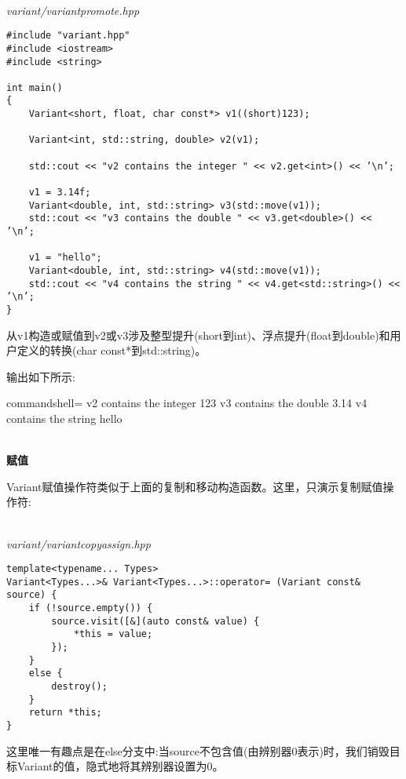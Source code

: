 \hspace*{\fill} \\ %
\noindent
\textit{variant/variantpromote.hpp}
\begin{lstlisting}[style=styleCXX]
#include "variant.hpp"
#include <iostream>
#include <string>

int main()
{
	Variant<short, float, char const*> v1((short)123);
	
	Variant<int, std::string, double> v2(v1);
	
	std::cout << "v2 contains the integer " << v2.get<int>() << ’\n’;
	
	v1 = 3.14f;
	Variant<double, int, std::string> v3(std::move(v1));
	std::cout << "v3 contains the double " << v3.get<double>() << ’\n’;
	
	v1 = "hello";
	Variant<double, int, std::string> v4(std::move(v1));
	std::cout << "v4 contains the string " << v4.get<std::string>() << ’\n’;
}
\end{lstlisting}

从v1构造或赋值到v2或v3涉及整型提升(short到int)、浮点提升(float到double)和用户定义的转换(char const*到std::string)。

输出如下所示:

\begin{tcblisting}{commandshell={}}
v2 contains the integer 123
v3 contains the double 3.14
v4 contains the string hello
\end{tcblisting}

\hspace*{\fill} \\ %
\noindent
\textbf{赋值}

Variant赋值操作符类似于上面的复制和移动构造函数。这里，只演示复制赋值操作符:

\hspace*{\fill} \\ %
\noindent
\textit{variant/variantcopyassign.hpp}
\begin{lstlisting}[style=styleCXX]
template<typename... Types>
Variant<Types...>& Variant<Types...>::operator= (Variant const& source) {
	if (!source.empty()) {
		source.visit([&](auto const& value) {
			*this = value;
		});
	}
	else {
		destroy();
	}
	return *this;
}
\end{lstlisting}

这里唯一有趣点是在else分支中:当source不包含值(由辨别器0表示)时，我们销毁目标Variant的值，隐式地将其辨别器设置为0。


















